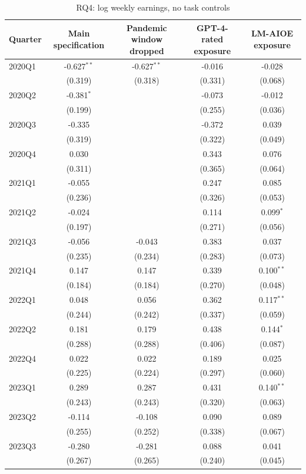 \begin{table}[htbp]\centering
\caption{RQ4: log weekly earnings, no task controls}
\begin{tabular}{lcccc}
\toprule
Quarter & Main specification & Pandemic window dropped & GPT-4-rated exposure & LM-AIOE exposure \\
\midrule
2020Q1 & -0.627$^{**}$ & -0.627$^{**}$ & -0.016 & -0.028 \\
 & (0.319) & (0.318) & (0.331) & (0.068) \\
2020Q2 & -0.381$^{*}$ &  & -0.073 & -0.012 \\
 & (0.199) &  & (0.255) & (0.036) \\
2020Q3 & -0.335 &  & -0.372 & 0.039 \\
 & (0.319) &  & (0.322) & (0.049) \\
2020Q4 & 0.030 &  & 0.343 & 0.076 \\
 & (0.311) &  & (0.365) & (0.064) \\
2021Q1 & -0.055 &  & 0.247 & 0.085 \\
 & (0.236) &  & (0.326) & (0.053) \\
2021Q2 & -0.024 &  & 0.114 & 0.099$^{*}$ \\
 & (0.197) &  & (0.271) & (0.056) \\
2021Q3 & -0.056 & -0.043 & 0.383 & 0.037 \\
 & (0.235) & (0.234) & (0.283) & (0.073) \\
2021Q4 & 0.147 & 0.147 & 0.339 & 0.100$^{**}$ \\
 & (0.184) & (0.184) & (0.270) & (0.048) \\
2022Q1 & 0.048 & 0.056 & 0.362 & 0.117$^{**}$ \\
 & (0.244) & (0.242) & (0.337) & (0.059) \\
2022Q2 & 0.181 & 0.179 & 0.438 & 0.144$^{*}$ \\
 & (0.288) & (0.288) & (0.406) & (0.087) \\
2022Q4 & 0.022 & 0.022 & 0.189 & 0.025 \\
 & (0.225) & (0.224) & (0.297) & (0.060) \\
2023Q1 & 0.289 & 0.287 & 0.431 & 0.140$^{**}$ \\
 & (0.243) & (0.243) & (0.320) & (0.063) \\
2023Q2 & -0.114 & -0.108 & 0.090 & 0.089 \\
 & (0.255) & (0.252) & (0.338) & (0.067) \\
2023Q3 & -0.280 & -0.281 & 0.088 & 0.041 \\
 & (0.267) & (0.265) & (0.240) & (0.045) \\

\end{tabular}
\end{table}
